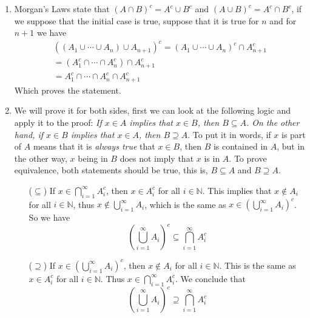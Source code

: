 \documentclass[./my-proofs.tex]{subfiles}
\begin{document}
\begin{enumerate}
    \item Morgan's Laws state that $(A\cap B)^{c} = A^{c} \cup B^{c}$ and ${(A \cup B)}^{c}
              = A^{c} \cap B^{c}$, if we suppose that the initial case is true, suppose that
          it is true for $n$ and for $n+1$ we have
          \begin{equation}
              \begin{split}
                  {\left(\left(A_1\cup \cdots \cup A_n\right)\cup A_{n+1}\right)}^{c} = {\left(A_1\cup \cdots \cup A_n\right)}^{c}\cap A_{n+1}^{c} \\
                  =  \left(A_1^{c} \cap \cdots \cap A_n^{c}\right)\cap A_{n+1}^{c}\\
                  =  A_1^{c} \cap \cdots \cap A_n^{c}\cap A_{n+1}^{c}
              \end{split}
          \end{equation}
          Which proves the statement.

    \item We will prove it for both sides, first we can look at the following logic and
          apply it to the proof: \textit{If $x\in A$ implies that $x\in B$, then
              $B\subseteq A$. On the other hand, if $x\in B$ implies that $x\in A$, then
              $B\supseteq A$}. To put it in words, if $x$ is part of $A$ means that it is
          \textit{always true} that $x\in B$, then $B$ is contained in $A$, but in the
          other way, $x$ being in $B$ does not imply that $x$ is in $A$. To prove
          equivalence, both statements should be true, this is, $B\subseteq A$ and
          $B\supseteq A$.

          \begin{itemize}
              \item[($\subseteq$)] If $x\in\bigcap^{\infty}_{i=1}{A_i^{c}}$, then $x\in A_i^{c}$ for all $i\in\mathbb{N}$.
                  This implies that $x\notin A_i$ for all $i\in\mathbb{N}$, thus $x\notin{\bigcup^{\infty}_{i=1}{A_i}}$, which is the
                  same as $x\in{\left(\bigcup^{\infty}_{i=1}{A_i}\right)}^{c}$. So we have
                  \begin{equation}
                      {\left(\bigcup^{\infty}_{i=1}{A_i}\right)}^{c} \subseteq \bigcap^{\infty}_{i=1}{A_i^{c}}
                  \end{equation}

              \item[($\supseteq$)] If $x\in{\left(\bigcup^{\infty}_{i=1}{A_i}\right)}^{c}$, then $x\notin A_i$ for all $i\in\mathbb{N}$.
                  This is the same as $x\in A_i^{c}$ for all $i\in\mathbb{N}$. Thus $x\in\bigcap^{\infty}_{i=1}{A_i^{c}}$. We conclude that
                  \begin{equation}
                      {\left(\bigcup^{\infty}_{i=1}{A_i}\right)}^{c} \supseteq \bigcap^{\infty}_{i=1}{A_i^{c}}
                  \end{equation}

          \end{itemize}
\end{enumerate}
\end{document}
